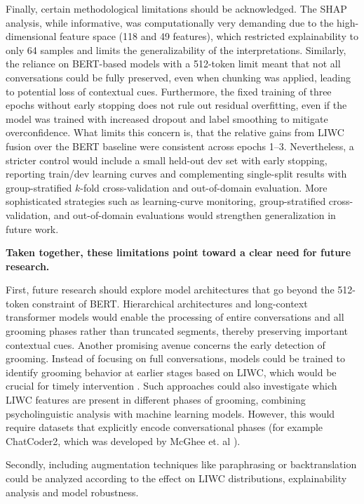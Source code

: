 Finally, certain methodological limitations should be acknowledged. The SHAP analysis, while informative, was computationally very demanding due to the high-dimensional feature space (118 and 49 features), which restricted explainability to only 64 samples and limits the generalizability of the interpretations. Similarly, the reliance on BERT-based models with a 512-token limit meant that not all conversations could be fully preserved, even when chunking was applied, leading to potential loss of contextual cues. Furthermore, the fixed training of three epochs without early stopping does not rule out residual overfitting, even if the model was trained with increased dropout and label smoothing to mitigate overconfidence. What limits this concern is, that the relative gains from LIWC fusion over the BERT baseline were consistent across epochs 1–3. Nevertheless, a stricter control would include a small held-out dev set with early stopping, reporting train/dev learning curves and complementing single-split results with group-stratified $k$-fold cross-validation and out-of-domain evaluation. More sophisticated strategies such as learning-curve monitoring, group-stratified cross-validation, and out-of-domain evaluations would strengthen generalization in future work.  

\textbf{Taken together, these limitations point toward a clear need for future research.}

First, future research should explore model architectures that go beyond the 512-token constraint of BERT. Hierarchical architectures and long-context transformer models would enable the processing of entire conversations and all grooming phases rather than truncated segments, thereby preserving important contextual cues. \cite{vogt2021early} Another promising avenue concerns the early detection of grooming. Instead of focusing on full conversations, models could be trained to identify grooming behavior at earlier stages based on LIWC, which would be crucial for timely intervention \cite{vogt2021early}. Such approaches could also investigate which LIWC features are present in different phases of grooming, combining psycholinguistic analysis with machine learning models. However, this would require datasets that explicitly encode conversational phases (for example ChatCoder2, which was developed by McGhee et. al \cite{chatcoder}). 

Secondly, including augmentation techniques like paraphrasing or backtranslation could be analyzed according to the effect on LIWC distributions, explainability analysis and model robustness. 

